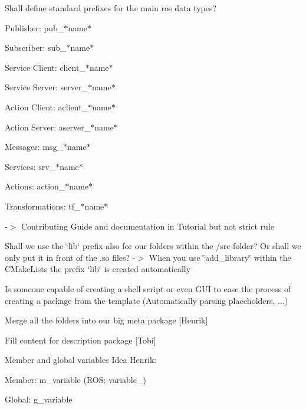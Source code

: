 \begin{DoxyEnumerate}
\item Shall define standard prefixes for the main ros data types?
\begin{DoxyItemize}
\item Publisher\+: pub\+\_\+$\ast$name$\ast$
\item Subscriber\+: sub\+\_\+$\ast$name$\ast$
\item Service Client\+: client\+\_\+$\ast$name$\ast$
\item Service Server\+: server\+\_\+$\ast$name$\ast$
\item Action Client\+: aclient\+\_\+$\ast$name$\ast$
\item Action Server\+: aserver\+\_\+$\ast$name$\ast$
\item Messages\+: msg\+\_\+$\ast$name$\ast$
\item Services\+: srv\+\_\+$\ast$name$\ast$
\item Actions\+: action\+\_\+$\ast$name$\ast$
\item Transformations\+: tf\+\_\+$\ast$name$\ast$
\end{DoxyItemize}

-\/$>$ Contributing Guide and documentation in Tutorial but not strict rule
\end{DoxyEnumerate}
\begin{DoxyEnumerate}
\item Shall we use the \char`\"{}lib\char`\"{} prefix also for our folders within the /src folder? Or shall we only put it in front of the .so files? -\/$>$ When you use \char`\"{}add\+\_\+library\char`\"{} within the C\+Make\+Lists the prefix \char`\"{}lib\char`\"{} is created automatically
\end{DoxyEnumerate}
\begin{DoxyEnumerate}
\item Is someone capable of creating a shell script or even G\+UI to ease the process of creating a package from the template (Automatically parsing placeholders, ...)
\end{DoxyEnumerate}
\begin{DoxyEnumerate}
\item Merge all the folders into our big meta package \mbox{[}Henrik\mbox{]}
\end{DoxyEnumerate}
\begin{DoxyEnumerate}
\item Fill content for description package \mbox{[}Tobi\mbox{]}
\end{DoxyEnumerate}
\begin{DoxyEnumerate}
\item Member and global variables Idea Henrik\+:
\begin{DoxyItemize}
\item Member\+: m\+\_\+variable (R\+OS\+: variable\+\_\+)
\item Global\+: g\+\_\+variable
\end{DoxyItemize}
\end{DoxyEnumerate}

